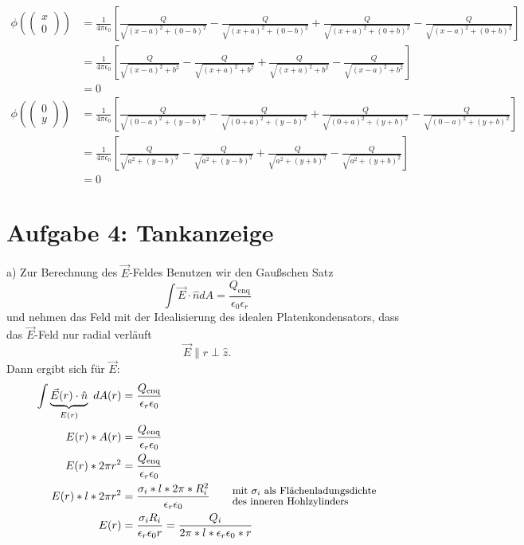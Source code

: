 \documentclass[11pt a4paper]{article}
\newcommand{\epsz}{\epsilon_0}
\newcommand{\kco}{\frac{1}{4\pi\epsilon_0}}
\begin{document}
\begin{align*}
	\phi \left( \begin{pmatrix} x \\ 0 \end{pmatrix} \right) 
	&= \kco \left[
		\frac{Q}{\sqrt{(x-a)^2 + (0-b)^2}}
		- \frac{Q}{\sqrt{(x+a)^2 + (0-b)^2}}
		+ \frac{Q}{\sqrt{(x + a)^2 + (0+b)^2}}
		- \frac{Q}{\sqrt{(x-a)^2 + (0+b)^2}}
	\right] \\
	&= \kco \left[
		\frac{Q}{\sqrt{(x-a)^2 + b^2}}
		- \frac{Q}{\sqrt{(x+a)^2 + b^2}}
		+ \frac{Q}{\sqrt{(x + a)^2 + b^2}}
		- \frac{Q}{\sqrt{(x-a)^2 + b^2}}
	\right] \\
	&= 0 \\
	\phi \left( \begin{pmatrix} 0 \\ y \end{pmatrix} \right) 
	&= \kco \left[
		\frac{Q}{\sqrt{(0-a)^2 + (y-b)^2}}
		- \frac{Q}{\sqrt{(0+a)^2 + (y-b)^2}}
		+ \frac{Q}{\sqrt{(0 + a)^2 + (y+b)^2}}
		- \frac{Q}{\sqrt{(0-a)^2 + (y+b)^2}}
	\right] \\
	&= \kco \left[
		\frac{Q}{\sqrt{a^2 + (y-b)^2}}
		- \frac{Q}{\sqrt{a^2 + (y-b)^2}}
		+ \frac{Q}{\sqrt{a^2 + (y+b)^2}}
		- \frac{Q}{\sqrt{a^2 + (y+b)^2}}
	\right] \\
	&= 0
\end{align*}

\newpage
\section*{Aufgabe 4: Tankanzeige}
\par{a)}
Zur Berechnung des $\vec E$-Feldes Benutzen wir den Gaußschen Satz
\[ \int \vec E \cdot \hat n dA = \frac{Q_\text{enq}}{\epsz\epsilon_r} \]
und nehmen das Feld mit der Idealisierung des idealen Platenkondensators,
dass das $\vec E$-Feld nur radial verläuft
\[ \vec E \parallel \hat r \perp \hat z. \]
Dann ergibt sich für $\vec E$:
\begin{align*}
	\int \underbrace{\vec E(r) \cdot \hat n}_{E(r)}	\ dA(r) 
	&= \frac{Q_\text{enq}}{\epsilon_r \epsz} \\
	E(r) * A(r) &= \frac{Q_\text{enq}}{\epsilon_r \epsz} \\
	E(r) * 2\pi r^2 &= \frac{Q_\text{enq}}{\epsilon_r \epsz} \\
	E(r) * l * 2\pi r^2 &= \frac{\sigma_i * l * 2\pi * R_i^2}
	{\epsilon_r \epsz}
	\qquad ^{\text{\small mit $\sigma_i$ als Flächenladungsdichte}}
	_{\text{\small des inneren Hohlzylinders}} \\
	E(r) &= \frac{\sigma_i R_i}{\epsilon_r \epsz r} 
	= \frac{Q_i}{2\pi * l * \epsilon_r \epsz * r}
\end{align*}
\end{document}
